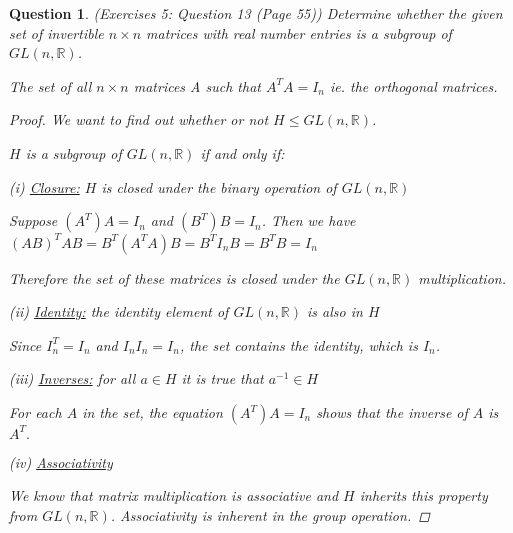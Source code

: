 \documentclass{article}
\newcommand*{\field}[1]{\mathbb{#1}}%
\newtheorem{ques}{Question}
\begin{document}
\begin{ques} (Exercises 5: Question 13 (Page 55))
	Determine whether the given set of invertible $n \times n$ matrices with real number entries is a subgroup of $GL(n, \field{R})$.
	
	The set of all $n \times  n$ matrices A such that $A^TA = I_n$ ie. the orthogonal matrices.
	\begin{proof}
		
		We want to find out whether or not $H \leq GL(n, \field{R})$. 
		
		$H$ is a subgroup of $GL(n, \field{R})$ if and only if:
		
		(i) \underline{Closure:} $H$ is closed under the binary operation of $GL(n, \field{R})$
		
		Suppose $(A^T)A = I_n$ and $(B^T)B = I_n$. Then we have $(AB)^TAB = B^T(A^TA)B = B^TI_nB = B^TB = I_n$
		
		Therefore the set of these matrices is closed under the $GL(n,\field{R})$ multiplication.
		
		(ii) \underline{Identity:} the identity element of $GL(n, \field{R})$ is also in $H$
		
		Since $I_n^T = I_n$ and $I_nI_n = I_n$, the set contains the identity, which is $I_n$.
		
		(iii) \underline{Inverses:} for all $a \in H$ it is true that $a^{-1} \in H$
		
		For each $A$ in the set, the equation $(A^T)A = I_n$ shows that the inverse of $A$ is $A^T.$
		
		(iv) \underline{Associativity}
		
		We know that matrix multiplication is associative and $H$ inherits this property from $GL(n,\field{R})$.  Associativity is inherent in the group operation.

	\end{proof}
\end{ques}
\end{document}
